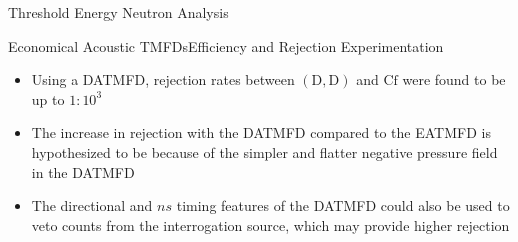 \documentclass{puposter}
\begin{document}
\begin{pucol}{7}{12}
\begin{pucell}{7}{6}{Threshold Energy Neutron Analysis}{}
\begin{pucell}{3}{3}{Economical Acoustic TMFDs}{Efficiency and Rejection Experimentation}
\begin{itemize}
      \item Using a DATMFD, rejection rates between $\mathrm{\left(D,D\right)}$ and $\mathrm{Cf}$ were found to be up to $1:10^{3}$
      \item The increase in rejection with the DATMFD compared to the EATMFD is hypothesized to be because of the simpler and flatter negative pressure field in the DATMFD
      \item The directional and $ns$ timing features of the DATMFD could also be used to veto counts from the interrogation source, which may provide higher rejection
    \end{itemize}
  \end{pucell}%
  \hspace*{\fill}
  \begin{pucell}{2}{3}{}{}
  \end{pucell}%
  \hspace*{\fill}
  \begin{pucell}{2}{3}{}{}
  \end{pucell} \\
  \vspace*{\fill}
\end{pucell}%
\end{pucol}%
\hspace*{1.5in}
\end{document}
